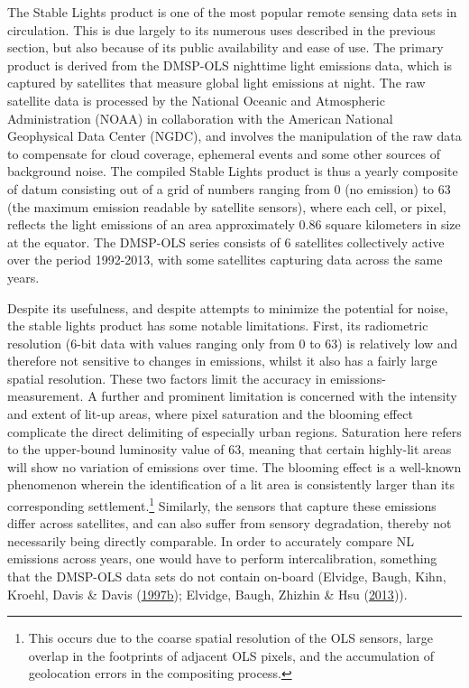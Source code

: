 \documentclass[11pt,preprint, authoryear]{elsarticle}
\numberwithin{equation}{section}
\numberwithin{figure}{section}
\numberwithin{table}{section}
\let\rmarkdownfootnote\footnote%
\def\footnote{\protect\rmarkdownfootnote}
\begin{document}
The Stable Lights product is one of the most popular remote sensing data
sets in circulation. This is due largely to its numerous uses described
in the previous section, but also because of its public availability and
ease of use. The primary product is derived from the DMSP-OLS nighttime
light emissions data, which is captured by satellites that measure
global light emissions at night. The raw satellite data is processed by
the National Oceanic and Atmospheric Administration (NOAA) in
collaboration with the American National Geophysical Data Center (NGDC),
and involves the manipulation of the raw data to compensate for cloud
coverage, ephemeral events and some other sources of background noise.
The compiled Stable Lights product is thus a yearly composite of datum
consisting out of a grid of numbers ranging from 0 (no emission) to 63
(the maximum emission readable by satellite sensors), where each cell,
or pixel, reflects the light emissions of an area approximately 0.86
square kilometers in size at the equator. The DMSP-OLS series consists
of 6 satellites collectively active over the period 1992-2013, with some
satellites capturing data across the same years.

Despite its usefulness, and despite attempts to minimize the potential
for noise, the stable lights product has some notable limitations.
First, its radiometric resolution (6-bit data with values ranging only
from 0 to 63) is relatively low and therefore not sensitive to changes
in emissions, whilst it also has a fairly large spatial resolution.
These two factors limit the accuracy in emissions-measurement. A further
and prominent limitation is concerned with the intensity and extent of
lit-up areas, where pixel saturation and the blooming effect complicate
the direct delimiting of especially urban regions. Saturation here
refers to the upper-bound luminosity value of 63, meaning that certain
highly-lit areas will show no variation of emissions over time. The
blooming effect is a well-known phenomenon wherein the identification of
a lit area is consistently larger than its corresponding
settlement.\footnote{This occurs due to the coarse spatial resolution of
  the OLS sensors, large overlap in the footprints of adjacent OLS
  pixels, and the accumulation of geolocation errors in the compositing
  process.} Similarly, the sensors that capture these emissions differ
across satellites, and can also suffer from sensory degradation, thereby
not necessarily being directly comparable. In order to accurately
compare NL emissions across years, one would have to perform
intercalibration, something that the DMSP-OLS data sets do not contain
on-board (Elvidge, Baugh, Kihn, Kroehl, Davis \& Davis
(\protect\hyperlink{ref-elvidge1997relation}{1997b}); Elvidge, Baugh,
Zhizhin \& Hsu (\protect\hyperlink{ref-elvidge2013viirs}{2013})).
\end{document}
